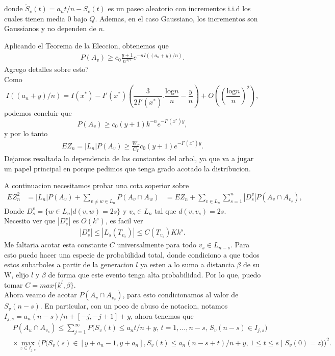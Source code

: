 \documentclass[12pt]{report}
\begin{document}
donde $\tilde{S}_v (t) = a_n t / n - S_v (t)$ es un paseo aleatorio con incrementos i.i.d los cuales tienen media $0$ bajo $Q$. 
Ademas, en el caso Gaussiano, los incrementos son Gaussianos y no dependen de $n$.

Aplicando el Teorema de la Eleccion, obtenemos que 
\begin{align}
    P(A_v) \geq c_0 \frac{y+1}{n^{3/2}} e^{-nI((a_n+y)/n)}.
\end{align}
Agrego detalles sobre esto? \\
Como 
\[
I((a_n+y)/n) = I(x^*) - I'(x^*)\left(\frac{3}{2I'(x^*)}.\frac{\text{log}n}{n}-\frac{y}{n}\right)+O\left(\left(\frac{\text{log}n}{n}\right)^2\right),
\]
podemos concluir que
\[
P(A_v) \geq c_0 (y+1)k^{-n}e^{-I'(x^*)y},
\]
y por lo tanto
\begin{align}
    EZ_n = |L_n| P(A_v) \geq \frac{W_T}{C_T}c_0 (y+1) e^{-I'(x^*)y}.
\end{align}
Dejamos resaltada la dependencia de las constantes del arbol, ya que va a jugar un papel principal en porque pedimos que tenga grado acotado la distribucion.
\par
A continuacion necesitamos probar una cota soperior sobre
\begin{align}
    EZ_n^2 &= |L_n|P(A_v) + \sum_{v \neq w \in L_n}^{} P(A_v \cap A_w) 
           &= EZ_n + \sum_{v \in L_n}^{} \sum_{s = 1}^{n} |D_s^v| P(A_v \cap A_{v_s}),
\end{align}
Donde $D_s^v = \{ w \in L_n | d(v,w) = 2s \} $ y $v_s \in L_n$ tal que $d(v,v_s) = 2s$. \\
Necesito ver que $|D_s^v|$ es $O(k^s)$, es facil ver
\begin{align}
    |D_s^v| \leq |L_s(T_{v_s})| \leq C(T_{v_s}) K k^s.
\end{align}
Me faltaria acotar esta constante $C$ universalmente para todo $v_s \in L_{n-s}$. Para esto puedo hacer una 
especie de probabilidad total, donde condiciono a que todos estos subarboles a partir de la generacion $l$ 
ya esten a lo sumo a distancia $\beta$ de su W, elijo $l$ y $\beta$ de forma que este evento tenga alta 
probabilidad. Por lo que, puedo tomar $C = max\{k^l, \beta\}$. \\
Ahora veamo de acotar $P(A_v \cap A_{v_s})$, para esto condicionamos al valor de $S_v (n-s)$. 
En particular, con un poco de abuso de notacion, notamos $I_{j,s} = a_n (n-s)/n + [-j,-j+1] + y$, ahora tenemos que
\begin{align}
&P(A_u \cap A_{v_s}) \leq \sum_{j=1}^{\infty} P\Big(S_v(t) \leq a_n t/n + y,\, t = 1, \ldots, n - s,\, S_v(n - s) \in I_{j,s}\Big) \nonumber \\
&\times \max_{z \in I_{j,s}} \Big(P\big(S_v(s) \in [y + a_n - 1, y + a_n],
S_v(t) \leq a_n(n - s + t)/n + y,\, 1 \leq t \leq s \mid S_v(0) = z\big)\Big)^2. \nonumber
\end{align}
\end{document}
